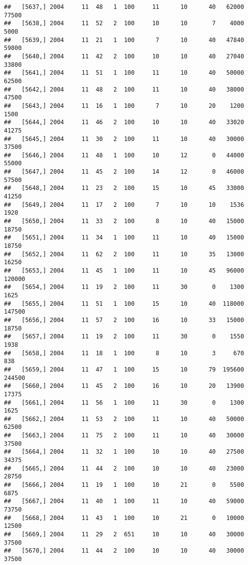 \documentclass{article}\usepackage[]{graphicx}\usepackage[]{color}
\makeatletter
\newenvironment{kframe}{%
 \def\at@end@of@kframe{}%
 \ifinner\ifhmode%
  \def\at@end@of@kframe{\end{minipage}}%
  \begin{minipage}{\columnwidth}%
 \fi\fi%
 \def\FrameCommand##1{\hskip\@totalleftmargin \hskip-\fboxsep
 \colorbox{shadecolor}{##1}\hskip-\fboxsep
     \hskip-\linewidth \hskip-\@totalleftmargin \hskip\columnwidth}%
 \MakeFramed {\advance\hsize-\width
   \@totalleftmargin\z@ \linewidth\hsize
   \@setminipage}}%
 {\par\unskip\endMakeFramed%
 \at@end@of@kframe}
\newenvironment{knitrout}{}{} %
\makeatother
\begin{document}
\begin{knitrout}
\begin{kframe}
\begin{verbatim}
##   [5637,] 2004     11  48   1  100     11      10      40   62000   77500
##   [5638,] 2004     11  52   2  100     10      10       7    4000    5000
##   [5639,] 2004     11  21   1  100      7      10      40   47840   59800
##   [5640,] 2004     11  42   2  100     10      10      40   27040   33800
##   [5641,] 2004     11  51   1  100     11      10      40   50000   62500
##   [5642,] 2004     11  48   2  100     11      10      40   38000   47500
##   [5643,] 2004     11  16   1  100      7      10      20    1200    1500
##   [5644,] 2004     11  46   2  100     10      10      40   33020   41275
##   [5645,] 2004     11  30   2  100     11      10      40   30000   37500
##   [5646,] 2004     11  48   1  100     10      12       0   44000   55000
##   [5647,] 2004     11  45   2  100     14      12       0   46000   57500
##   [5648,] 2004     11  23   2  100     15      10      45   33000   41250
##   [5649,] 2004     11  17   2  100      7      10      10    1536    1920
##   [5650,] 2004     11  33   2  100      8      10      40   15000   18750
##   [5651,] 2004     11  34   1  100     11      10      40   15000   18750
##   [5652,] 2004     11  62   2  100     11      10      35   13000   16250
##   [5653,] 2004     11  45   1  100     11      10      45   96000  120000
##   [5654,] 2004     11  19   2  100     11      30       0    1300    1625
##   [5655,] 2004     11  51   1  100     15      10      40  118000  147500
##   [5656,] 2004     11  57   2  100     16      10      33   15000   18750
##   [5657,] 2004     11  19   2  100     11      30       0    1550    1938
##   [5658,] 2004     11  18   1  100      8      10       3     670     838
##   [5659,] 2004     11  47   1  100     15      10      79  195600  244500
##   [5660,] 2004     11  45   2  100     16      10      20   13900   17375
##   [5661,] 2004     11  56   1  100     11      30       0    1300    1625
##   [5662,] 2004     11  53   2  100     11      10      40   50000   62500
##   [5663,] 2004     11  75   2  100     11      10      40   30000   37500
##   [5664,] 2004     11  32   1  100     10      10      40   27500   34375
##   [5665,] 2004     11  44   2  100     10      10      40   23000   28750
##   [5666,] 2004     11  19   1  100     10      21       0    5500    6875
##   [5667,] 2004     11  40   1  100     11      10      40   59000   73750
##   [5668,] 2004     11  43   1  100     10      21       0   10000   12500
##   [5669,] 2004     11  29   2  651     10      10      40   30000   37500
##   [5670,] 2004     11  44   2  100     10      10      40   30000   37500

\end{verbatim}
\end{kframe}
\end{knitrout}
\end{document}
